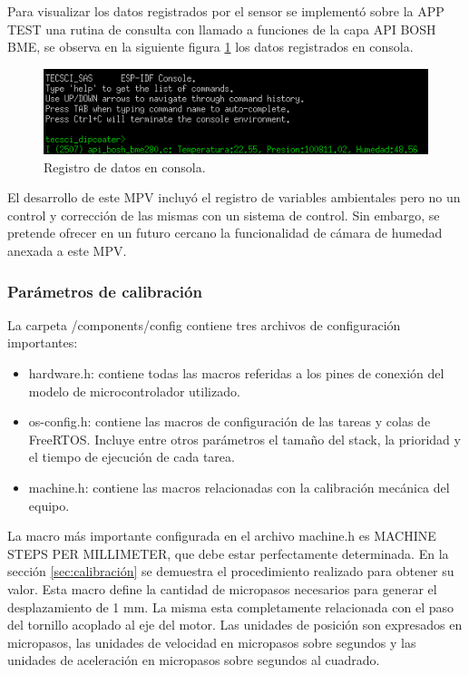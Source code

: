 Para visualizar los datos registrados por el sensor se implementó sobre la APP TEST una rutina de consulta con llamado a funciones de la capa API BOSH BME, se observa en la siguiente figura \ref{fig:api_bosh_consola} los datos registrados en consola.

\begin{figure}[h!]
	\centering
	\includegraphics[width=1\textwidth]{./Figures/registro_bme.png}
	\caption{Registro de datos en consola.}
	\label{fig:api_bosh_consola}
\end{figure}

 
El desarrollo de este MPV incluyó el registro de variables ambientales pero no un control y corrección de las mismas con un sistema de control. Sin embargo, se pretende ofrecer en un futuro cercano la funcionalidad de cámara de humedad anexada a este MPV.

\subsubsection{Parámetros de calibración}
\label{subsec:calibracion}

La carpeta /components/config contiene tres archivos de configuración importantes:
\begin{itemize}
\item hardware.h: contiene todas las macros referidas a los pines de conexión del modelo de microcontrolador utilizado.
\item os-config.h: contiene las macros de configuración de las tareas y colas de FreeRTOS. Incluye entre otros parámetros el tamaño del stack, la prioridad y el tiempo de ejecución de cada tarea.
\item machine.h: contiene las macros relacionadas con la calibración mecánica del equipo.
\end{itemize}


La macro más importante configurada en el archivo machine.h es MACHINE STEPS PER MILLIMETER, que debe estar perfectamente determinada. En la sección \ref{sec:calibración} se demuestra el procedimiento realizado para obtener su valor. Esta macro define la cantidad de micropasos necesarios para generar el desplazamiento de 1 mm. La misma esta completamente relacionada con el paso del tornillo acoplado al eje del motor. Las unidades de posición son expresados en micropasos, las unidades de velocidad en micropasos sobre segundos y las unidades de aceleración en micropasos sobre segundos al cuadrado. 

